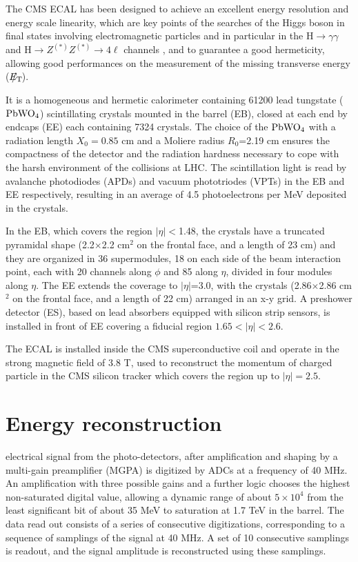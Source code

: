\documentclass[journal]{IEEEtran}
\newcommand{\ETslash}{\ensuremath{E_{\mathrm{T}}\hspace{-1.1em}/\kern0.45em}}
\begin{document}
The CMS ECAL \cite{CMS:1997ema} has been designed to achieve an excellent energy resolution and energy scale linearity, which are key points of the searches of the Higgs boson in final states involving electromagnetic particles and in particular in the H$\to\gamma\gamma$ \cite{Khachatryan:2014ira} and H$\to Z^{(\ast)}Z^{(\ast)}\to 4\ell$ channels \cite{Chatrchyan:2013mxa}, and to guarantee a good hermeticity, allowing good performances on the measurement of the missing transverse energy ($\ETslash$).

It is a homogeneous and hermetic calorimeter containing 61200 lead tungstate ($\rm PbWO_4$) scintillating crystals mounted in the barrel (EB), closed at each end by endcaps (EE) each containing 7324 crystals. The choice of the $\rm PbWO_4$ with a radiation length $X_0=0.85$ cm and a Moliere radius $R_0$=2.19 cm ensures the compactness of the detector and the radiation hardness necessary to cope with the harsh environment of the collisions at LHC. The scintillation light is read by avalanche photodiodes (APDs) and vacuum phototriodes (VPTs) in the EB and EE
respectively, resulting in an average of 4.5 photoelectrons per MeV deposited in the crystals. 

In the EB, which covers the region $\vert\eta\vert<$1.48, the crystals have a truncated pyramidal shape (2.2$\times$2.2 cm$^2$ on the frontal face, and a length of 23 cm) and they are organized in 36 supermodules, 18 on each side of the beam interaction point, each with 20 channels along $\phi$ and 85 along $\eta$, divided in four modules along $\eta$. The EE extends the coverage to $\vert\eta\vert$=3.0, with the crystals (2.86$\times$2.86 cm$^2$ on the frontal face, and a length of 22 cm) arranged in an x-y grid. A preshower detector (ES), based on lead absorbers equipped with silicon strip sensors, is installed in front of EE covering a fiducial region $1.65<\vert\eta\vert<2.6$.

The ECAL is installed inside the CMS superconductive coil and operate in the strong magnetic field of 3.8 T, used to reconstruct the momentum of charged particle in the CMS silicon tracker which covers the region up to $\vert\eta\vert=2.5$.



\section{Energy reconstruction}
\label{sec:energyreco}
 electrical signal from the photo-detectors, after amplification and shaping by a multi-gain preamplifier (MGPA) is digitized by ADCs at a frequency of 40 MHz. An amplification with three possible gains and a further logic chooses the highest non-saturated digital value, allowing a dynamic range of about $5 \times 10^4$ from the least significant bit of about 35 MeV to saturation at 1.7 TeV in the barrel. The data read out consists of a series of consecutive digitizations, corresponding to a sequence of samplings of the signal at 40 MHz. A set of 10 consecutive samplings is readout, and the signal amplitude is reconstructed using these samplings. 
\end{document}
